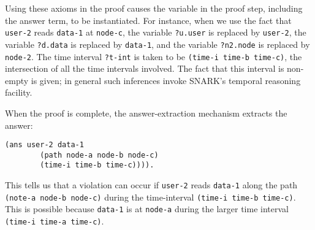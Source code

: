 Using these axioms in the proof causes the variable in the proof step, including the answer term, to be instantiated.  
For instance, when we use the fact that \verb'user-2' reads \verb'data-1' at \verb'node-c', the variable \verb'?u.user' is replaced by \verb'user-2', the variable \verb'?d.data' is replaced by \verb'data-1', and the variable \verb'?n2.node' is replaced by \verb'node-2'.  
The time interval \verb'?t-int' is taken to be \verb'(time-i time-b time-c)', the intersection of all the time intervals involved. The fact that this interval is non-empty is given; in general such inferences invoke SNARK's temporal reasoning facility. 

When the proof is complete, the answer-extraction mechanism extracts the answer:
\begin{lstlisting}[numbers=none]
   (ans user-2 data-1 
        (path node-a node-b node-c)
        (time-i time-b time-c)))).
\end{lstlisting} 
This tells us that a violation can occur if \verb'user-2' reads \verb'data-1' along the path \verb'(note-a node-b node-c)' during the time-interval \verb'(time-i time-b time-c)'. 
This is possible because \verb'data-1' is at \verb'node-a' during the larger time interval 
\verb'(time-i time-a time-c)'.

